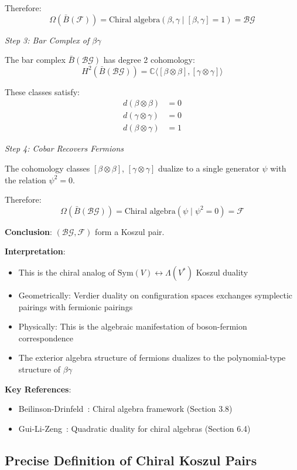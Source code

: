\begin{example}
\begin{example}
Therefore:
$$\Omega(\bar{B}(\mathcal{F})) = \text{Chiral algebra}(\beta, \gamma \mid [\beta,\gamma]=1) = \mathcal{BG}$$

\textit{Step 3: Bar Complex of $\beta\gamma$}

The bar complex $\bar{B}(\mathcal{BG})$ has degree 2 cohomology:
$$H^2(\bar{B}(\mathcal{BG})) = \mathbb{C}\langle [\beta \otimes \beta], [\gamma \otimes \gamma] \rangle$$

These classes satisfy:
\begin{align}
d(\beta \otimes \beta) &= 0 \\
d(\gamma \otimes \gamma) &= 0 \\
d(\beta \otimes \gamma) &= 1
\end{align}

\textit{Step 4: Cobar Recovers Fermions}

The cohomology classes $[\beta \otimes \beta]$, $[\gamma \otimes \gamma]$ dualize to a single generator $\psi$ 
with the relation $\psi^2 = 0$.

Therefore:
$$\Omega(\bar{B}(\mathcal{BG})) = \text{Chiral algebra}(\psi \mid \psi^2=0) = \mathcal{F}$$

\textbf{Conclusion}: $(\mathcal{BG}, \mathcal{F})$ form a Koszul pair. 

\textbf{Interpretation}:
\begin{itemize}
\item This is the chiral analog of $\text{Sym}(V) \leftrightarrow \Lambda(V^*)$ Koszul duality
\item Geometrically: Verdier duality on configuration spaces exchanges symplectic pairings with fermionic pairings
\item Physically: This is the algebraic manifestation of boson-fermion correspondence
\item The exterior algebra structure of fermions dualizes to the polynomial-type structure of $\beta\gamma$
\end{itemize}

\textbf{Key References}:
\begin{itemize}
\item Beilinson-Drinfeld~\cite{BeilinsonDrinfeld}: Chiral algebra framework (Section 3.8)
\item Gui-Li-Zeng~\cite{GLZ-2212.11252v1}: Quadratic duality for chiral algebras (Section 6.4)
\end{itemize}
\end{example}

\subsection{Precise Definition of Chiral Koszul Pairs}
\label{subsec:chiral-koszul-pairs-precise}


\end{example}
